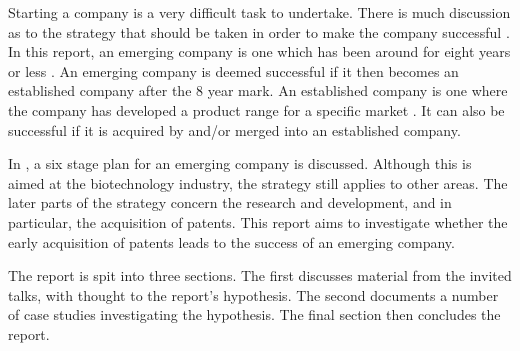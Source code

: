 {}


Starting a company is a very difficult task to undertake. 
There is much discussion as to the strategy that should be taken in order to make the company successful \cite{}.
In this report, an emerging company is one which has been around for eight years or less \cite{zahra1996technology}. 
An emerging company is deemed successful if it then becomes an established company after the 8 year mark.
An established company is one where the company has developed a product range for a specific market \cite{kekale2007successful}.
It can also be successful if it is acquired by and/or merged into an established company. 


In \cite{zahra1996technology}, a six stage plan for an emerging company is discussed. 
Although this is aimed at the biotechnology industry, the strategy still applies to other areas. 
The later parts of the strategy concern the research and development, and in particular, the acquisition of patents. 
This report aims to investigate whether the early acquisition of patents leads to the success of an emerging company.

The report is spit into three sections. 
The first discusses material from the invited talks, with thought to the report's hypothesis.
The second documents a number of case studies investigating the hypothesis.
The final section then concludes the report.
